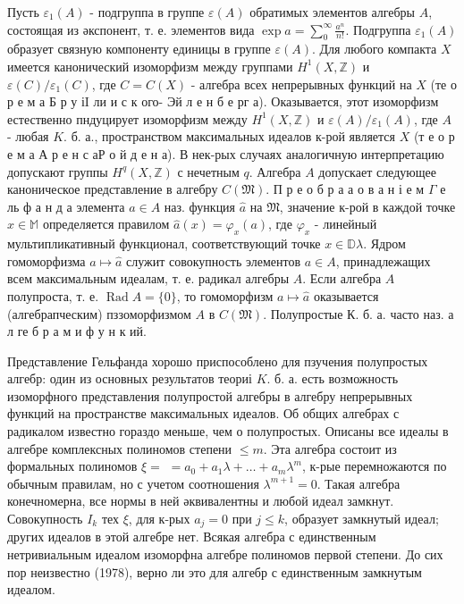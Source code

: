 \documentclass[10pt]{article}
\begin{document}
Пусть $\varepsilon_{1}(A)$ - подгруппа в группе $\varepsilon(A)$ обратимых элементов алгебры $A$, состоящая из әкспонент, т. е. элементов вида $\exp a=\sum_{0}^{\infty} \frac{a^{n}}{n !}$. Подгруппа $\varepsilon_{1}(A)$ образует связную компоненту единицы в группе $\varepsilon(A)$. Для любого компакта $X$ имеется канонический изоморфизм между группами $H^{1}(X, \mathbb{Z})$ и $\varepsilon(C) / \varepsilon_{1}(C)$, где $C=C(X)$ - алгебра всех непрерывных функций на $X$ (те о р е м а Б р у іI ли и с к ого- Эй л е н б е рг а). Оказывается, этот изоморфизм естественно пндуцирует изоморфизм между $H^{1}(X, \mathbb{Z})$ и $\varepsilon(A) / \varepsilon_{1}(A)$, где $A$ - любая $K$. б. а., пространством максимальных идеалов к-рой является $X$ (т е о р е м а А р е н с аР о й д е н а). В нек-рых случаях аналогичную интерпретацию допускают группы $H^{q}(X, \mathbb{Z})$ с нечетным $q$. Алгебра $A$ допускает следующее каноническое представление в алгебру $C(\mathfrak{M})$. П р е о б р а $а$ о в а н і е м $\Gamma$ е ль ф а н д а элемента $a \in A$ наз. функция $\hat{a}$ на $\mathfrak{M}$, значение к-рой в каждой точке $x \in \mathbb{M}$ определяется правилом $\hat{a}(x)=\varphi_{x}(a)$, где $\varphi_{x}$ - линейный мультипликативный функционал, соответствующий точке $x \in \mathbb{D} \lambda$. Ядром гомоморфизма $a \mapsto \hat{a}$ служит совокупность элементов $a \in A$, принадлежащих всем максимальным идеалам, т. е. радикал алгебры $A$. Если алгебра $A$ полупроста, т. е. $\operatorname{Rad} A=\{0\}$, то гомоморфизм $a \mapsto \hat{a}$ оказывается (алгебрапческим) пззоморфизмом $A$ в $C(\mathfrak{M})$. Полупростые К. б. а. часто наз. а л ге б р а м и ф у н к ий.



Представление Гельфанда хорошо приспособлено для пзучения полупростых алгебр: один из основных результатов теориі $K$. б. а. есть возможность изоморфного представления полупростой алгебры в алгебру непрерывных функций на пространстве максимальных идеалов. Об общих алгебрах с радикалом известно гораздо меньше, чем о полупростых. Описаны все идеалы в алгебре комплексных полиномов степени $\leqslant m$. Эта алгебра состоит из формальных полиномов $\xi=$ $=a_{0}+a_{1} \lambda+\ldots+a_{m} \lambda^{m}$, к-рые перемножаются по обычным правилам, но с учетом соотношения $\lambda^{m+1}=0$. Такая алгебра конечномерна, все нормы в ней әквивалентны и любой идеал замкнут. Совокупность $I_{k}$ тех $\xi$, для к-рых $a_{j}=0$ при $j \leqslant k$, образует замкнутый идеал; других идеалов в этой алгебре нет. Всякая алгебра с единственным нетривиальным идеалом изоморфна алгебре полиномов первой степени. До сих пор неизвестно (1978), верно ли это для алгебр с единственным замкнутым идеалом.
\end{document}

